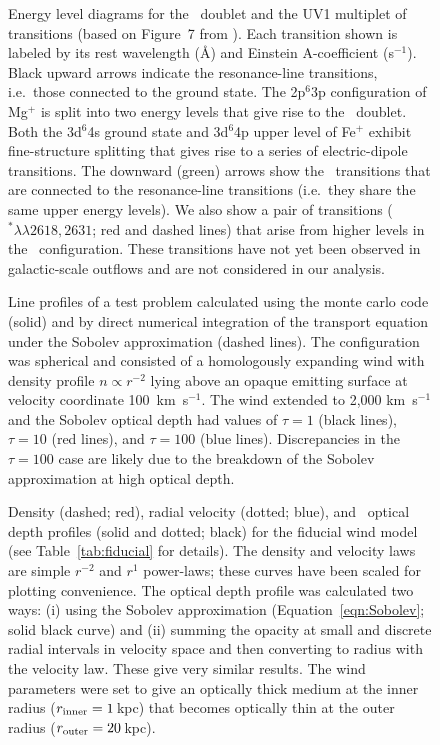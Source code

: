 \documentclass[12pt,preprint]{aastex}
\begin{document}
\begin{figure}
\caption{
Energy level diagrams for the \mgiid\ doublet and the UV1
multiplet of  transitions   
(based on Figure~7 from \cite{hmt+99}).
Each transition shown is
labeled by its rest wavelength (\AA) and Einstein A-coefficient
(s$^{-1}$). Black upward arrows
indicate the resonance-line transitions, i.e.\ those connected to the ground
state.  The 2p$^6$3p configuration of Mg$^+$ is split into
two energy levels that give rise to the \mgiid\ doublet.  
Both the 3d$^6$4s ground state and 3d$^6$4p upper level of Fe$^+$
exhibit fine-structure splitting that gives rise to a series of
electric-dipole transitions. 
The downward (green) arrows show the \feiis\ transitions that are connected to the
resonance-line transitions (i.e.\ they share the same upper energy
levels).  We also show a pair of transitions ($^* \lambda\lambda
2618,2631$; red and dashed lines) that arise from higher levels in the \zconfig\
configuration.  These transitions have not yet been observed in
galactic-scale outflows and are not considered in our analysis.
}
\label{fig:energy}
\end{figure}

\begin{figure}
\caption{
Line profiles of a test problem calculated using the monte carlo code (solid) and by direct numerical integration of the transport equation under the Sobolev approximation (dashed lines).  The configuration was  spherical and consisted of a homologously expanding wind  with density profile $n \propto r^{-2}$  lying above an opaque emitting surface at velocity coordinate 100~km~s$^{-1}$.  
The wind extended to 2,000 km~s$^{-1}$ and the Sobolev optical depth had values of  $\tau = 1$ (black lines), $\tau = 10$ (red lines), and $\tau = 100$ (blue lines).    Discrepancies in the $\tau = 100$ case are likely due to the breakdown of the Sobolev approximation at high optical depth. 
}
\label{fig:oneline_test}
\end{figure}


\begin{figure}
\caption{
Density (dashed; red), radial velocity (dotted; blue), and
\mgiia\ optical depth profiles (solid and dotted; black) for the fiducial
wind model (see Table~\ref{tab:fiducial} for details).
The density and velocity laws are simple $r^{-2}$ and $r^1$
power-laws; these curves have been scaled for plotting
convenience.  
The optical depth profile was calculated two ways: (i) using the
Sobolev approximation (Equation~\ref{eqn:Sobolev}; solid black curve)
and (ii) summing
the opacity at small and discrete radial intervals in velocity space
and then converting to radius with the velocity law.  These give
very similar results. 
The wind parameters were set to give an optically thick medium at the
inner radius ($r_{\rm inner} = 1$\,kpc) that becomes optically thin at
the outer radius ($r_{\rm outer} = 20$\,kpc). 
}
\label{fig:fiducial_nvt}
\end{figure}
\end{document}
